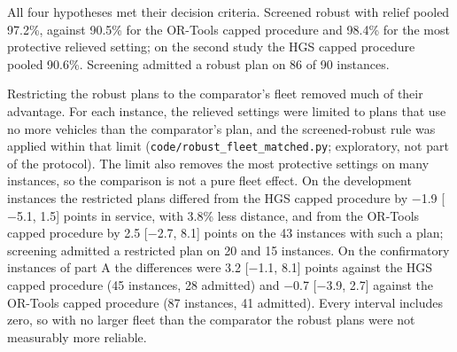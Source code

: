 All four hypotheses met their decision criteria. Screened robust with relief pooled 97.2\%, against 90.5\% for the OR-Tools capped procedure and 98.4\% for the most protective relieved setting; on the second study the HGS capped procedure pooled 90.6\%. Screening admitted a robust plan on 86 of 90 instances.

Restricting the robust plans to the comparator's fleet removed much of their advantage. For each instance, the relieved settings were limited to plans that use no more vehicles than the comparator's plan, and the screened-robust rule was applied within that limit (\texttt{code/robust\_fleet\_matched.py}; exploratory, not part of the protocol). The limit also removes the most protective settings on many instances, so the comparison is not a pure fleet effect. On the development instances the restricted plans differed from the HGS capped procedure by $-$1.9 [$-$5.1, 1.5] points in service, with 3.8\% less distance, and from the OR-Tools capped procedure by 2.5 [$-$2.7, 8.1] points on the 43 instances with such a plan; screening admitted a restricted plan on 20 and 15 instances. On the confirmatory instances of part A the differences were 3.2 [$-$1.1, 8.1] points against the HGS capped procedure (45 instances, 28 admitted) and $-$0.7 [$-$3.9, 2.7] against the OR-Tools capped procedure (87 instances, 41 admitted). Every interval includes zero, so with no larger fleet than the comparator the robust plans were not measurably more reliable.
